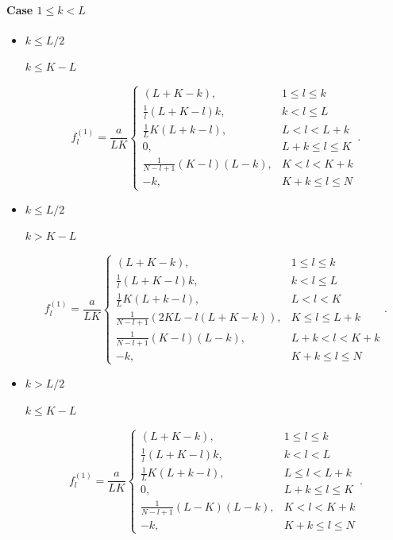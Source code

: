 \documentclass[engproc, submit, article,pdftex,moreauthors]{Definitions/mdpi}
\begin{document}
\paragraph{Case $1 \leq k < L$}
\begin{itemize}
\item
$k \leq L/2$

$k \leq K - L$

$$f^{(1)}_l = \frac{a}{{LK}}
\begin{cases}
	(L + K - k), & \text{$1 \leq l \leq k$}\\
	\frac{1}{l}(L + K - l)k, & \text{$k < l \leq L$}\\
	\frac{1}{L}K(L + k - l), &\text{$L < l < L + k$}\\
	0, &\text{$L + k \leq l \leq K$}\\
	\frac{1}{N - l + 1}(K - l)(L - k), &\text{$K < l < K + k$}\\
	-k, &\text{$K + k \leq l \leq N $}
\end{cases}.
$$

\item
$k \leq L/2$

$k > K - L$

$$f^{(1)}_l = \frac{a}{{LK}}
\begin{cases}
	(L + K - k), & \text{$1 \leq l \leq k$}\\
	\frac{1}{l}(L + K - l)k, & \text{$k < l \leq L$}\\
	\frac{1}{L}K(L + k- l), &\text{$L < l < K$}\\
	\frac{1}{N - l + 1}(2KL - l(L + K - k)), &\text{$K \leq l \leq L + k$}\\
	\frac{1}{N - l + 1}( K - l)(L - k), &\text{$L + k < l < K + k$}\\
	-k, &\text{$K + k \leq l \leq N$}
\end{cases}.
$$

\item
$k > L/2$

$k \leq K - L$

$$f^{(1)}_l = \frac{a}{{LK}}
\begin{cases}
	(L + K - k), & \text{$1 \leq l \leq k$}\\
	\frac{1}{l}(L + K - l)k, & \text{$k < l < L$}\\
	\frac{1}{L}K(L + k - l), &\text{$L \leq l < L + k$}\\
	0, &\text{$L + k \leq l \leq K$}\\
	\frac{1}{N - l + 1}(L - K)(L - k), &\text{$K < l < K + k$}\\
	-k, &\text{$K + k \leq l \leq N$}
\end{cases}.
$$


\end{itemize}
\end{document}
